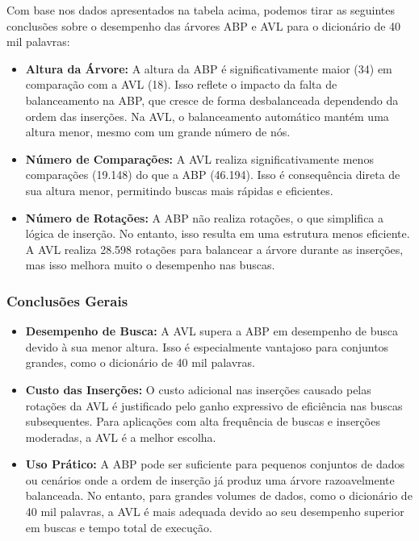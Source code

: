 \documentclass[a4paper, 12pt, english]{article}
\begin{document}
Com base nos dados apresentados na tabela acima, podemos tirar as seguintes conclusões sobre o desempenho das árvores ABP e AVL para o dicionário de 40 mil palavras:

\begin{itemize}
    \item \textbf{Altura da Árvore:} 
    A altura da ABP é significativamente maior (34) em comparação com a AVL (18). Isso reflete o impacto da falta de balanceamento na ABP, que cresce de forma desbalanceada dependendo da ordem das inserções. Na AVL, o balanceamento automático mantém uma altura menor, mesmo com um grande número de nós.

    \item \textbf{Número de Comparações:} 
    A AVL realiza significativamente menos comparações (19.148) do que a ABP (46.194). Isso é consequência direta de sua altura menor, permitindo buscas mais rápidas e eficientes.

    \item \textbf{Número de Rotações:} 
    A ABP não realiza rotações, o que simplifica a lógica de inserção. No entanto, isso resulta em uma estrutura menos eficiente. A AVL realiza 28.598 rotações para balancear a árvore durante as inserções, mas isso melhora muito o desempenho nas buscas.

\end{itemize}

\subsubsection{Conclusões Gerais}
\begin{itemize}
    \item \textbf{Desempenho de Busca:} 
    A AVL supera a ABP em desempenho de busca devido à sua menor altura. Isso é especialmente vantajoso para conjuntos grandes, como o dicionário de 40 mil palavras.

    \item \textbf{Custo das Inserções:} 
    O custo adicional nas inserções causado pelas rotações da AVL é justificado pelo ganho expressivo de eficiência nas buscas subsequentes. Para aplicações com alta frequência de buscas e inserções moderadas, a AVL é a melhor escolha.

    \item \textbf{Uso Prático:} 
    A ABP pode ser suficiente para pequenos conjuntos de dados ou cenários onde a ordem de inserção já produz uma árvore razoavelmente balanceada. No entanto, para grandes volumes de dados, como o dicionário de 40 mil palavras, a AVL é mais adequada devido ao seu desempenho superior em buscas e tempo total de execução.
\end{itemize}
\end{document}
